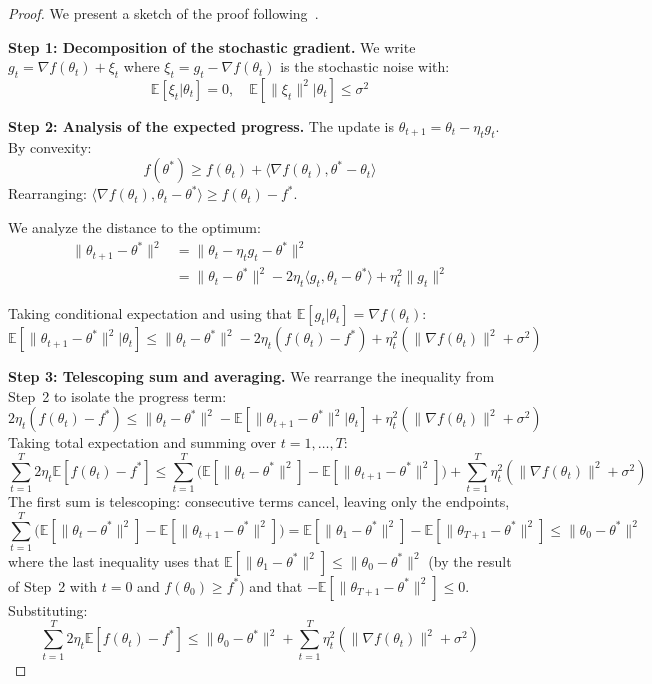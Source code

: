 \begin{proof}
	We present a sketch of the proof following~\citet{bottou2018optimization}.

	\textbf{Step 1: Decomposition of the stochastic gradient.}
	We write \(g_t = \nabla f(\theta_t) + \xi_t\) where \(\xi_t = g_t - \nabla f(\theta_t)\) is the stochastic noise with:
	\[
		\mathbb{E}[\xi_t | \theta_t] = 0, \quad \mathbb{E}[\|\xi_t\|^2 | \theta_t] \leq \sigma^2
	\]

	\textbf{Step 2: Analysis of the expected progress.}
	The update is \(\theta_{t+1} = \theta_t - \eta_t g_t\). By convexity:
	\[
		f(\theta^*) \geq f(\theta_t) + \langle \nabla f(\theta_t), \theta^* - \theta_t \rangle
	\]
	Rearranging: \(\langle \nabla f(\theta_t), \theta_t - \theta^* \rangle \geq f(\theta_t) - f^*\).

	We analyze the distance to the optimum:
	\begin{align*}
		\|\theta_{t+1} - \theta^*\|^2 &= \|\theta_t - \eta_t g_t - \theta^*\|^2 \\
		&= \|\theta_t - \theta^*\|^2 - 2\eta_t\langle g_t, \theta_t - \theta^* \rangle + \eta_t^2\|g_t\|^2
	\end{align*}

	Taking conditional expectation and using that \(\mathbb{E}[g_t|\theta_t] = \nabla f(\theta_t)\):
	\[
		\mathbb{E}[\|\theta_{t+1} - \theta^*\|^2 | \theta_t] \leq \|\theta_t - \theta^*\|^2 - 2\eta_t(f(\theta_t) - f^*) + \eta_t^2(\|\nabla f(\theta_t)\|^2 + \sigma^2)
	\]

	\textbf{Step 3: Telescoping sum and averaging.}
	We rearrange the inequality from Step~2 to isolate the progress term:
	\[
		2\eta_t(f(\theta_t) - f^*) \leq \|\theta_t - \theta^*\|^2 - \mathbb{E}[\|\theta_{t+1} - \theta^*\|^2 | \theta_t] + \eta_t^2(\|\nabla f(\theta_t)\|^2 + \sigma^2)
	\]
	Taking total expectation and summing over \(t = 1, \ldots, T\):
	\[
		\sum_{t=1}^T 2\eta_t \mathbb{E}[f(\theta_t) - f^*] \leq \sum_{t=1}^T \Big(\mathbb{E}[\|\theta_t - \theta^*\|^2] - \mathbb{E}[\|\theta_{t+1} - \theta^*\|^2]\Big) + \sum_{t=1}^T \eta_t^2(\|\nabla f(\theta_t)\|^2 + \sigma^2)
	\]
	The first sum is telescoping: consecutive terms cancel, leaving only the endpoints,
	\[
		\sum_{t=1}^T \Big(\mathbb{E}[\|\theta_t - \theta^*\|^2] - \mathbb{E}[\|\theta_{t+1} - \theta^*\|^2]\Big) = \mathbb{E}[\|\theta_1 - \theta^*\|^2] - \mathbb{E}[\|\theta_{T+1} - \theta^*\|^2] \leq \|\theta_0 - \theta^*\|^2
	\]
	where the last inequality uses that \(\mathbb{E}[\|\theta_1 - \theta^*\|^2] \leq \|\theta_0 - \theta^*\|^2\) (by the result of Step~2 with \(t=0\) and \(f(\theta_0) \geq f^*\)) and that \(-\mathbb{E}[\|\theta_{T+1} - \theta^*\|^2] \leq 0\). Substituting:
	\[
		\sum_{t=1}^T 2\eta_t \mathbb{E}[f(\theta_t) - f^*] \leq \|\theta_0 - \theta^*\|^2 + \sum_{t=1}^T \eta_t^2(\|\nabla f(\theta_t)\|^2 + \sigma^2)
	\]


\end{proof}
